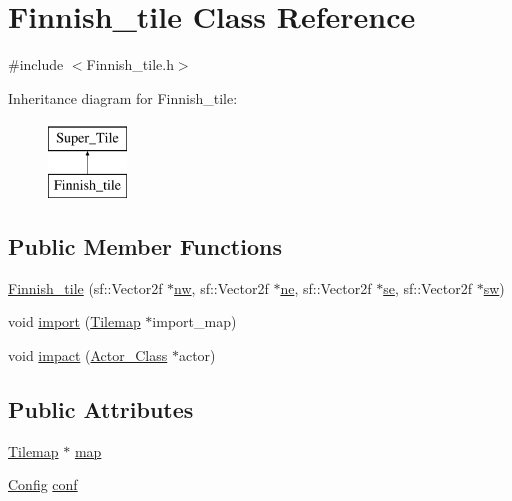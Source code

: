 \hypertarget{class_finnish__tile}{}\section{Finnish\+\_\+tile Class Reference}
\label{class_finnish__tile}


{\ttfamily \#include $<$Finnish\+\_\+tile.\+h$>$}

Inheritance diagram for Finnish\+\_\+tile\+:\begin{figure}[H]
\begin{center}
\leavevmode
\includegraphics[height=2.000000cm]{class_finnish__tile}
\end{center}
\end{figure}
\subsection*{Public Member Functions}
\begin{DoxyCompactItemize}
\item 
\hyperlink{class_finnish__tile_a82be12031661ef2e48107319d76a1a30}{Finnish\+\_\+tile} (sf\+::\+Vector2f $\ast$\hyperlink{class_super___tile_ad6bcea1fd54f67808f54ba2aacd88596}{nw}, sf\+::\+Vector2f $\ast$\hyperlink{class_super___tile_a55f6d2860da36f13019bd4e0d18364ca}{ne}, sf\+::\+Vector2f $\ast$\hyperlink{class_super___tile_ab384b89a7a631b8b75c4d405c51a23e1}{se}, sf\+::\+Vector2f $\ast$\hyperlink{class_super___tile_abe9efe0c3d1ed440395225843435dfc8}{sw})
\item 
void \hyperlink{class_finnish__tile_a6b20f4db90ec0522efcd766ec6bc0ab2}{import} (\hyperlink{class_tilemap}{Tilemap} $\ast$import\+\_\+map)
\item 
void \hyperlink{class_finnish__tile_a04fae2c808c18027ec8b74915df33220}{impact} (\hyperlink{class_actor___class}{Actor\+\_\+\+Class} $\ast$actor)
\end{DoxyCompactItemize}
\subsection*{Public Attributes}
\begin{DoxyCompactItemize}
\item 
\hyperlink{class_tilemap}{Tilemap} $\ast$ \hyperlink{class_finnish__tile_ae1bc1de931787b9cc0e4752b64518d94}{map}
\item 
\hyperlink{class_config}{Config} \hyperlink{class_finnish__tile_a29a7324c82ba5ca613dec5a346a5ebe0}{conf}
\end{DoxyCompactItemize}


